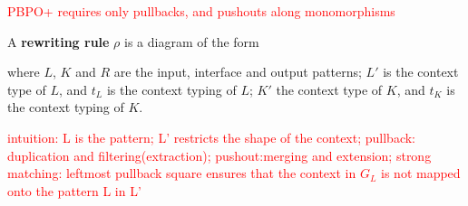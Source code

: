 \textcolor{red}{PBPO+ requires only pullbacks, and pushouts along monomorphisms}
\begin{definition}
  \label{def:pbpop:rule}
  A \pbpop \textbf{rewriting rule} \(\rho\) is a diagram of the form
\begin{center}

\end{center}

\noindent where \(L\), \(K\) and \(R\) are the input, interface and output patterns; \(L'\) is the context type of $L$, and \(t_L\) is the context typing of $L$; \(K'\) the context type of $K$, and \(t_K\) is the context typing of $K$. 
\end{definition} 
\textcolor{red}{intuition:
L is the pattern; L' restricts the shape of the context; pullback: duplication and filtering(extraction); pushout:merging and extension; strong matching: leftmost pullback square ensures that the context in $G_L$ is not mapped onto the pattern L in L'
}

